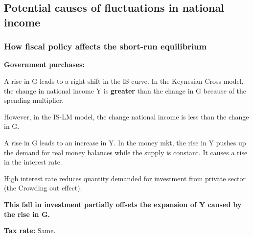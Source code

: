 \documentclass[10pt]{article}
\begin{document}
\subsection{Potential causes of fluctuations in national income}

\subsubsection{How fiscal policy affects the short-run equilibrium}
{\textbf {Government purchases:}}

\begin{figure}[H]
\end{figure}



A rise in G leads to a right shift in the IS curve. In the Keynesian Cross model,
the change in national income Y is {\textbf {greater}} than the change in G because of 
the spending multiplier.


However, in the IS-LM model, the change national income is less than the change in G.

A rise in G leads to an increase in Y. In the money mkt, the rise in Y pushes up the
demand for real money balances while the supply is constant. It causes a rise in the
interest rate.

High interest rate reduces quantity demanded for investment from private sector (the Crowding out effect).


{\textbf {This fall in investment partially offsets the expansion of Y caused by the
rise in G.}}



{\textbf {Tax rate:}}
Same.
\end{document}
